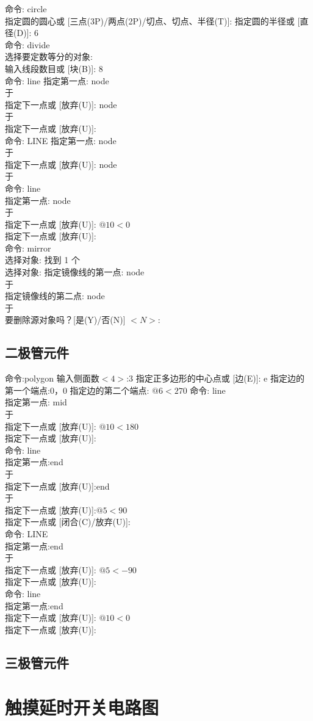 \noindent
命令: circle\\
 指定圆的圆心或 [三点(3P)/两点(2P)/切点、切点、半径(T)]:
指定圆的半径或 [直径(D)]: 6\\
命令: divide\\
选择要定数等分的对象:\\
输入线段数目或 [块(B)]: 8\\
命令: line 指定第一点: node\\
于\\
指定下一点或 [放弃(U)]: node\\
于\\
指定下一点或 [放弃(U)]:\\
命令:  LINE 指定第一点: node\\
于\\
指定下一点或 [放弃(U)]: node\\
于\\
命令: line\\
指定第一点: node\\
于\\
指定下一点或 [放弃(U)]: $@10<0$\\
指定下一点或 [放弃(U)]:\\
命令: mirror\\
选择对象: 找到 1 个\\
选择对象:  指定镜像线的第一点: node\\
于\\
指定镜像线的第二点: node\\
于\\
要删除源对象吗？[是(Y)/否(N)] $<N>:$
\subsection{二极管元件}

命令:polygon 输入侧面数$ <4>$:3
指定正多边形的中心点或 [边(E)]: e
指定边的第一个端点:0，0
指定边的第二个端点: $@6<270$
命令: line \\
指定第一点: mid\\
于\\
指定下一点或 [放弃(U)]: $@10<180$\\
指定下一点或 [放弃(U)]:\\
命令: line \\
指定第一点:end\\
于\\
指定下一点或 [放弃(U)]:end\\
于\\
指定下一点或 [放弃(U)]:$ @5<90$\\
指定下一点或 [闭合(C)/放弃(U)]:\\
命令:  LINE \\
指定第一点:end\\
于\\
指定下一点或 [放弃(U)]: $@5<-90$\\
指定下一点或 [放弃(U)]:\\
命令: line\\
指定第一点:end\\
指定下一点或 [放弃(U)]: $@10<0$\\
指定下一点或 [放弃(U)]:\\

\subsection{三极管元件}

\section{触摸延时开关电路图}
\endinput